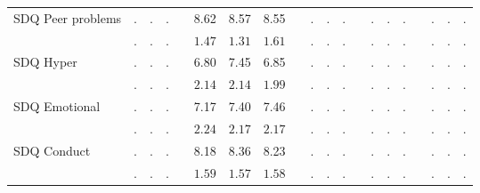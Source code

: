 \begin{center}
{\begin{longtable}{L{5cm} c c c p{.5cm} c c c p{.5cm} c c c p{.5cm} c c c p{.5cm} c c c}
 \quad SDQ Peer problems & . &         . &         . & &      8.62 &      8.57 &      8.55 & &         . &         . &         . & &         . &         . &         . & &         . &         . &         . \\*
 \quad & $\mathit{        .}$ & $\mathit{        .}$ & $\mathit{        .}$ & & $\mathit{     1.47}$ & $\mathit{     1.31}$ & $\mathit{     1.61}$ & & $\mathit{        .}$ & $\mathit{        .}$ & $\mathit{        .}$ & & $\mathit{        .}$ & $\mathit{        .}$ & $\mathit{        .}$ & & $\mathit{        .}$ & $\mathit{        .}$ & $\mathit{        .}$ \\[.2em]
 \quad SDQ Hyper & . &         . &         . & &      6.80 &      7.45 &      6.85 & &         . &         . &         . & &         . &         . &         . & &         . &         . &         . \\*
 \quad & $\mathit{        .}$ & $\mathit{        .}$ & $\mathit{        .}$ & & $\mathit{     2.14}$ & $\mathit{     2.14}$ & $\mathit{     1.99}$ & & $\mathit{        .}$ & $\mathit{        .}$ & $\mathit{        .}$ & & $\mathit{        .}$ & $\mathit{        .}$ & $\mathit{        .}$ & & $\mathit{        .}$ & $\mathit{        .}$ & $\mathit{        .}$ \\[.2em]
 \quad SDQ Emotional & . &         . &         . & &      7.17 &      7.40 &      7.46 & &         . &         . &         . & &         . &         . &         . & &         . &         . &         . \\*
 \quad & $\mathit{        .}$ & $\mathit{        .}$ & $\mathit{        .}$ & & $\mathit{     2.24}$ & $\mathit{     2.17}$ & $\mathit{     2.17}$ & & $\mathit{        .}$ & $\mathit{        .}$ & $\mathit{        .}$ & & $\mathit{        .}$ & $\mathit{        .}$ & $\mathit{        .}$ & & $\mathit{        .}$ & $\mathit{        .}$ & $\mathit{        .}$ \\[.2em]
 \quad SDQ Conduct & . &         . &         . & &      8.18 &      8.36 &      8.23 & &         . &         . &         . & &         . &         . &         . & &         . &         . &         . \\*
 \quad & $\mathit{        .}$ & $\mathit{        .}$ & $\mathit{        .}$ & & $\mathit{     1.59}$ & $\mathit{     1.57}$ & $\mathit{     1.58}$ & & $\mathit{        .}$ & $\mathit{        .}$ & $\mathit{        .}$ & & $\mathit{        .}$ & $\mathit{        .}$ & $\mathit{        .}$ & & $\mathit{        .}$ & $\mathit{        .}$ & $\mathit{        .}$ \\[.2em]

\end{longtable}}
\end{center}
